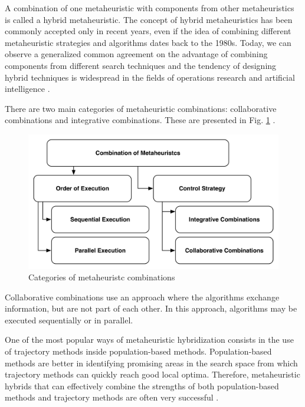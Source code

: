 A combination of one metaheuristic with components from other metaheuristics is called a hybrid metaheuristic. The concept of hybrid metaheuristics has been commonly accepted only in recent years, even if the idea of combining different metaheuristic strategies and algorithms dates back to the 1980s. Today, we can observe a generalized common agreement on the advantage of combining components from different search techniques and the tendency of designing hybrid techniques is widespread in the fields of operations research and artificial intelligence \cite{raidl2010metaheuristic}. 


There are two main categories of metaheuristic combinations: collaborative combinations and integrative combinations. These are presented in Fig. \ref{fig:metaheuristc} \cite{Raidl2006}.

\begin{figure}[h]
\centering
\includegraphics[width=1\textwidth]{./images/metaheuristc2.png}
\caption{Categories of metaheuristc combinations \cite{Puchinger2005} }
\label{fig:metaheuristc}
\end{figure}

Collaborative combinations use an approach where the algorithms exchange information, but are not part of each other. In this approach, algorithms may be executed sequentially or in parallel. 

One of the most popular ways of metaheuristic hybridization consists in the use of trajectory methods inside population-based methods. Population-based methods are better in identifying promising areas in the search space from which trajectory methods can quickly reach good local optima. Therefore, metaheuristic hybrids that can effectively combine the strengths of both population-based methods and trajectory methods are often very successful \cite{raidl2010metaheuristic}.


